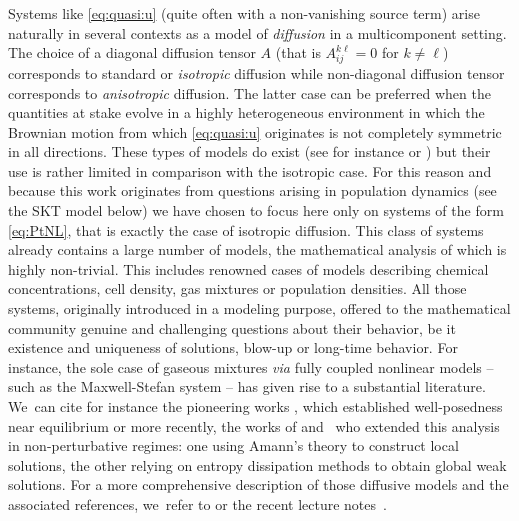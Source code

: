 \documentclass[10pt]{amsart}
\theoremstyle{definition}
\begin{document}
Systems like \eqref{eq:quasi:u} (quite often with a non-vanishing source term) arise naturally in several contexts as a model of \emph{diffusion} in a multicomponent setting. The choice of a diagonal diffusion tensor $A$ (that is $A_{ij}^{k\ell} = 0$ for $k\neq \ell$) corresponds to standard or \emph{isotropic} diffusion while non-diagonal diffusion tensor corresponds to \emph{anisotropic} diffusion. The latter case can be preferred when the quantities at stake evolve in a highly heterogeneous environment in which the Brownian motion from which \eqref{eq:quasi:u} originates is not completely symmetric in all directions. These types of models do exist (see for instance \cite{chen_perthame} or \cite{hillen}) but their use is rather limited in comparison with the isotropic case. For this reason and because this work originates from questions arising in population dynamics (see the SKT model below) we have chosen to focus here only on systems of the form \eqref{eq:PtNL}, that is exactly the case of isotropic diffusion. This class of systems already contains a large number of models, the mathematical analysis of which is highly non-trivial. {This includes renowned cases of models describing chemical concentrations, cell density, gas mixtures or population densities. All those systems, originally introduced in a modeling purpose, offered to the mathematical community genuine and challenging questions about their behavior, be it existence and uniqueness of solutions, blow-up or long-time behavior. For instance, the sole case of gaseous mixtures \emph{via} fully coupled nonlinear models -- such as the Maxwell-Stefan system -- has given rise to a substantial literature. We~can cite for instance the pioneering works \cite{gio,giomassot}, which established well-posedness near equilibrium or more recently, the works of \cite{bothe} and~\cite{jungstel} who extended this analysis in non-perturbative regimes: one using Amann's theory to construct local solutions, the other relying on entropy dissipation methods to obtain global weak solutions. For a more comprehensive description of those diffusive models and the associated references, we~refer to \cite[Chap.\,4]{ansgar} or the recent lecture notes~\cite{jung_lecture_notes}.}
\end{document}
